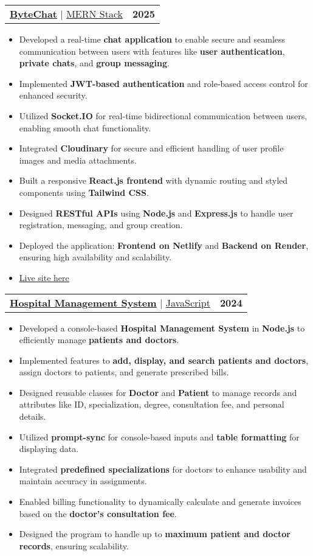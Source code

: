 \documentclass[letterpaper,11pt]{article}
\makeatletter
\newcommand{\resumeItem}[1]{
  \item\small{
    {#1 \vspace{-2pt}}
  }
}
\newcommand{\resumeProjectHeading}[2]{
    \item
    \begin{tabular*}{1.001\textwidth}{l@{\extracolsep{\fill}}r}
      \small#1 & \textbf{\small #2}\\
    \end{tabular*}\vspace{-7pt}
}
\newcommand{\resumeItemListStart}{\begin{itemize}}
\newcommand{\resumeItemListEnd}{\end{itemize}\vspace{-5pt}}
\makeatother
\begin{document}
      \resumeProjectHeading
   {\href{https://github.com/mastershuvam/ByteChat}{\textbf{\large{\underline{ByteChat}}}} \href{https://bytechat.onrender.com/login}{\raisebox{-0.1\height}\faExternalLink} $|$ \large{\underline{MERN Stack}}}{2025}
   \resumeItemListStart
     \resumeItem{\normalsize{Developed a real-time \textbf{chat application} to enable secure and seamless communication between users with features like \textbf{user authentication}, \textbf{private chats}, and \textbf{group messaging}.}}
     \resumeItem{\normalsize{Implemented \textbf{JWT-based authentication} and role-based access control for enhanced security.}}
     \resumeItem{\normalsize{Utilized \textbf{Socket.IO} for real-time bidirectional communication between users, enabling smooth chat functionality.}}
     \resumeItem{\normalsize{Integrated \textbf{Cloudinary} for secure and efficient handling of user profile images and media attachments.}}
     \resumeItem{\normalsize{Built a responsive \textbf{React.js frontend} with dynamic routing and styled components using \textbf{Tailwind CSS}.}}
     \resumeItem{\normalsize{Designed \textbf{RESTful APIs} using \textbf{Node.js} and \textbf{Express.js} to handle user registration, messaging, and group creation.}}
     \resumeItem{\normalsize{Deployed the application: \textbf{Frontend on Netlify} and \textbf{Backend on Render}, ensuring high availability and scalability.}}
     \resumeItem{\textcolor{accent}{\href{https://bytechat.onrender.com/login}{\underline{\normalsize{Live site here}}}}}
   \resumeItemListEnd
   \vspace{-13pt}

          \resumeProjectHeading
   {\href{https://github.com/mastershuvam/Hospital}{\textbf{\large{\underline{Hospital Management System}}}} \href{https://github.com/mastershuvam/Hospital}{\raisebox{-0.1\height}\faExternalLink} $|$ \large{\underline{JavaScript}}}{2024}
   \resumeItemListStart
     \resumeItem{\normalsize{Developed a console-based \textbf{Hospital Management System} in \textbf{Node.js} to efficiently manage \textbf{patients and doctors}.}}
     \resumeItem{\normalsize{Implemented features to \textbf{add, display, and search patients and doctors}, assign doctors to patients, and generate prescribed bills.}}
     \resumeItem{\normalsize{Designed reusable classes for \textbf{Doctor} and \textbf{Patient} to manage records and attributes like ID, specialization, degree, consultation fee, and personal details.}}
     \resumeItem{\normalsize{Utilized \textbf{prompt-sync} for console-based inputs and \textbf{table formatting} for displaying data.}}
     \resumeItem{\normalsize{Integrated \textbf{predefined specializations} for doctors to enhance usability and maintain accuracy in assignments.}}
     \resumeItem{\normalsize{Enabled billing functionality to dynamically calculate and generate invoices based on the \textbf{doctor’s consultation fee}.}}
     \resumeItem{\normalsize{Designed the program to handle up to \textbf{maximum patient and doctor records}, ensuring scalability.}}
   \resumeItemListEnd
   \vspace{-12pt}
\end{document}
